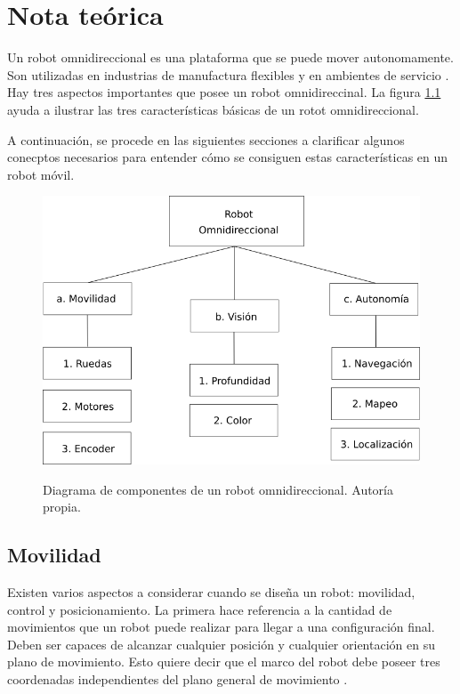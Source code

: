 \chapter{Nota teórica} 
\label{C:nota_teorica}

Un robot omnidireccional es una plataforma que se puede mover autonomamente. Son utilizadas en industrias de manufactura flexibles y en ambientes de servicio \cite{Batlle2009}. Hay tres aspectos importantes que posee un robot omnidireccinal. La figura \ref{fig:robot_omnidireccional} ayuda a ilustrar las tres características básicas de un rotot omnidireccional.

A continuación, se procede en las siguientes secciones a clarificar algunos conecptos necesarios para entender cómo se consiguen estas características en un robot móvil.

\begin{figure}[H]
  \centering
  \includegraphics[scale=0.6]{robot_omnidireccional.png}
  \label{fig:robot_omnidireccional}
  \caption{Diagrama de componentes de un robot omnidireccional. Autoría propia.}
\end{figure}


\section{Movilidad}
Existen varios aspectos a considerar cuando se diseña un robot: movilidad, control y posicionamiento. La primera hace referencia a la cantidad de movimientos que un robot puede realizar para llegar a una configuración final. Deben ser capaces de alcanzar cualquier posición y cualquier orientación en su plano de movimiento. Esto quiere decir que el marco del robot debe poseer tres coordenadas independientes del plano general de movimiento \cite{Batlle2009}.

